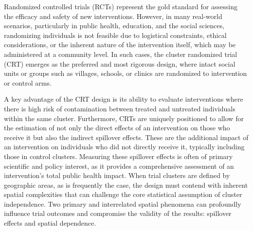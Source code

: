 \documentclass{article}[11pt]
\begin{document}
Randomized controlled trials (RCTs) represent the gold standard for assessing the efficacy and safety of new interventions\cite{pocock_clinical_1983}\cite{smith_field_2015}. However, in many real-world scenarios, particularly in public health, education, and the social sciences, randomizing individuals is not feasible due to logistical constraints, ethical considerations, or the inherent nature of the intervention itself, which may be administered at a community level. In such cases, the cluster randomized trial (CRT) emerges as the preferred and most rigorous design, where intact social units or groups such as villages, schools, or clinics are randomized to intervention or control arms\cite{hayes_cluster_2017}\cite{donner_design_2000}.

A key advantage of the CRT design is its ability to evaluate interventions where there is high risk of contamination between treated and untreated individuals within the same cluster\cite{hayes_cluster_2017}\cite{hudgens_toward_2008}. Furthermore, CRTs are uniquely positioned to allow for the estimation of not only the direct effects of an intervention on those who receive it but also the indirect spillover effects. These are the additional impact of an intervention on individuals who did not directly receive it, typically including those in control clusters. Measuring these spillover effects is often of primary scientific and policy interest, as it provides a comprehensive assessment of an intervention's total public health impact\cite{hayes_cluster_2017}\cite{hayes_design_2000}. When trial clusters are defined by geographic areas, as is frequently the case, the design must contend with inherent spatial complexities that can challenge the core statistical assumption of cluster independence. Two primary and interrelated spatial phenomena can profoundly influence trial outcomes and compromise the validity of the results: spillover effects and spatial dependence\cite{hayes_cluster_2017}\cite{smith_field_2015}.
\end{document}
